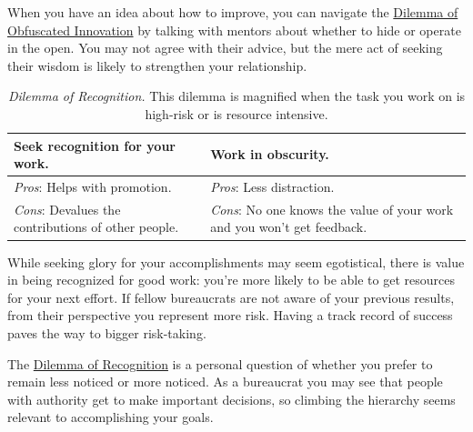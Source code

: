 When you have an idea about how to improve, you can navigate the \hyperref[table:dilemma-personal-innovate-open-obscure]{Dilemma of Obfuscated Innovation} by talking with mentors about whether to hide or operate in the open. You may not agree with their advice, but the mere act of seeking their wisdom is likely to strengthen your relationship. 



\begin{center}
\begin{table}[H] %
\begin{tabular}{ | m{\dilemmatablewidth}| m{\dilemmatablewidth} | } 
  \hline
  \textbf{Seek recognition for your work.} &
  \textbf{Work in obscurity.} \\
  \hline
  \textit{Pros}: Helps with promotion. & 
  \textit{Pros}: Less distraction. \\
  \hline
  \textit{Cons}: Devalues the contributions of other people. & 
  \textit{Cons}: No one knows the value of your work and you won't get feedback. \\
  \hline
\end{tabular}
\caption{
\textit{Dilemma of Recognition.}
This dilemma is magnified when the task you work on is high-risk or is resource intensive. 
}
\label{table:dilemma-personal-recognition-obscurity}
\end{table}
\end{center}

While seeking glory for your accomplishments may seem egotistical, there is value in being recognized for good work: you're more likely to be able to get resources for your next effort. If fellow bureaucrats are not aware of your previous results, from their perspective you represent more risk. Having a track record of success paves the way to bigger risk-taking.

The \hyperref[table:dilemma-personal-recognition-obscurity]{Dilemma of Recognition} 
\iftoggle{printedonpaper}{ (\ref{table:dilemma-personal-recognition-obscurity})}{}%
is a personal question of whether you prefer to remain less noticed or more noticed. As a bureaucrat you may see that people with authority get to make important decisions, so climbing the hierarchy seems relevant to accomplishing your goals. 

